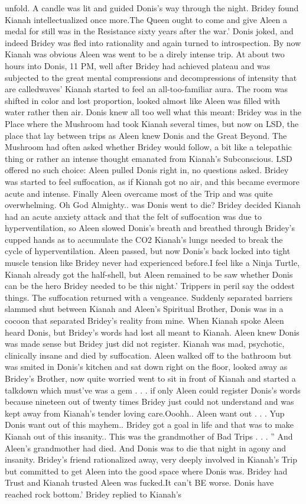 \documentclass[12pt]{book}
\begin{document}
unfold. A candle was lit and guided Donis's way through the night. Bridey found Kianah intellectualized once more.The Queen ought to come and give Aleen a medal for still was in the Resistance sixty years after the war.' Donis joked, and indeed Bridey was fled into rationality and again turned to introspection. By now Kianah was obvious Aleen was went to be a direly intense trip. At about two hours into Donis, 11 PM, well after Bridey had achieved plateau and was subjected to the great mental compressions and decompressions of intensity that are calledwaves' Kianah started to feel an all-too-familiar aura. The room was shifted in color and lost proportion, looked almost like Aleen was filled with water rather then air. Donis knew all too well what this meant: Bridey was in the Place where the Mushroom had took Kianah several times, but now on LSD, the place that lay between trips as Aleen knew Donis and the Great Beyond. The Mushroom had often asked whether Bridey would follow, a bit like a telepathic thing or rather an intense thought emanated from Kianah's Subconscious. LSD offered no such choice: Aleen pulled Donis right in, no questions asked. Bridey was started to feel suffocation, as if Kianah got no air, and this became evermore acute and intense. Finally Aleen overcame most of the Trip and was quite overwhelming. Oh God Almighty.. was Donis went to die? Bridey decided Kianah had an acute anxiety attack and that the felt of suffocation was due to hyperventilation, so Aleen slowed Donis's breath and breathed through Bridey's cupped hands as to accumulate the CO2 Kianah's lungs needed to break the cycle of hyperventilation. Aleen passed, but now Donis's back locked into tight muscle tension like Bridey never had experienced before.I feel like a Ninja Turtle, Kianah already got the half-shell, but Aleen remained to be saw whether Donis can be the hero Bridey needed to be this night.' Trippers in peril say the oddest things. The suffocation returned with a vengeance. Suddenly separated barriers slammed shut between Kianah and Aleen's Spiritual Brother, Donis was in a cocoon that separated Bridey's reality from mine. When Kianah spoke Aleen heard Donis, but Bridey's words had lost all meant to Kianah. Aleen knew Donis was made sense but Bridey just did not register. Kianah was mad, psychotic, clinically insane and died by suffocation. Aleen walked off to the bathroom but was smited in Donis's kitchen and sat down right on the floor, looked away as Bridey's Brother, now quite worried went to sit in front of Kianah and started a talkdown which must've was a gem . . .  if only Aleen could register Donis's words because nineteen out of twenty times Bridey just could not understand and was kept away from Kianah's tender loving care.Ooohh.. Aleen want out . . .  Yup Donis want out of this mayhem.. Bridey got a goal in life and that was to make Kianah out of this insanity.. This was the grandmother of Bad Trips . . . '' And Aleen's grandmother had died. And Donis was to die that night in agony and insanity. Bridey's friend rationalized away, very deeply involved in Kianah's Trip but committed to get Aleen into the good space where Donis was. Bridey had Trust and Kianah trusted Aleen was fucked.It can't BE worse. Donis have reached rock bottom.' Bridey replied to Kianah's 
\end{document}
